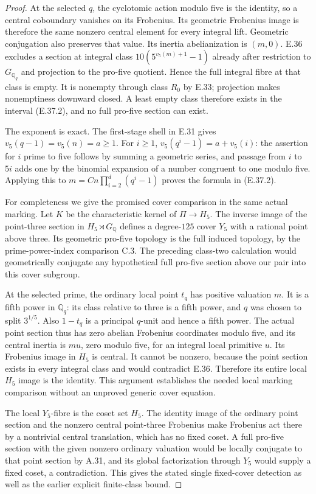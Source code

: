 \begin{proof}
At the selected $q$, the cyclotomic action modulo five is the
identity, so a central coboundary vanishes on its Frobenius.
Its geometric Frobenius image is therefore the same nonzero
central element for every integral lift.  Geometric conjugation
also preserves that value.  Its inertia abelianization is $(m,0)$.
E.36 excludes a section at integral class
$10(5^{v_5(m)+1}-1)$ already after restriction to
$G_{\mathbb Q_q}$ and projection to the pro-five quotient.
Hence the full integral fibre at that class is empty.
It is nonempty through class $R_0$ by E.33; projection makes
nonemptiness downward closed.  A least empty class therefore
exists in the interval (E.37.2), and no full pro-five section can
exist.

The exponent is exact.  The first-stage shell in E.31 gives
$v_5(q-1)=v_5(n)=a\ge1$.  For $i\ge1$,
$v_5(q^i-1)=a+v_5(i)$: the assertion for $i$ prime to five follows
by summing a geometric series, and passage from $i$ to $5i$
adds one by the binomial expansion of a number congruent to one
modulo five.  Applying this to
$m=Cn\prod_{i=2}^d(q^i-1)$ proves the formula in (E.37.2).

For completeness we give the promised cover comparison in the
same actual marking.  Let $K$ be the characteristic kernel of
$\Pi\to H_5$.  The inverse image of the point-three section in
$H_5\rtimes G_{\mathbb Q}$ defines a degree-$125$ cover $Y_5$
with a rational point above three.  Its geometric pro-five
topology is the full induced topology, by the prime-power-index
comparison C.3.  The preceding class-two calculation would
geometrically conjugate any hypothetical full pro-five section
above our pair into this cover subgroup.

At the selected prime, the ordinary local point $t_q$ has positive
valuation $m$.  It is a fifth power in $\mathbb Q_q$: its class
relative to three is a fifth power, and $q$ was chosen to split
$3^{1/5}$.  Also $1-t_q$ is a principal $q$-unit and hence a
fifth power.  The actual point section thus has zero abelian
Frobenius coordinates modulo five, and its central inertia is
$mu$, zero modulo five, for an integral local primitive $u$.
Its Frobenius image in $H_5$ is central.  It cannot be nonzero,
because the point section exists in every integral class and
would contradict E.36.  Therefore its entire local $H_5$ image
is the identity.  This argument establishes the needed local
marking comparison without an unproved generic cover equation.

The local $Y_5$-fibre is the coset set $H_5$.  The identity image
of the ordinary point section and the nonzero central
point-three Frobenius make Frobenius act there by a nontrivial
central translation, which has no fixed coset.  A full pro-five
section with the given nonzero ordinary valuation would be
locally conjugate to that point section by A.31, and its global
factorization through $Y_5$ would supply a fixed coset, a
contradiction.  This gives the stated single fixed-cover
detection as well as the earlier explicit finite-class bound.
\end{proof}

